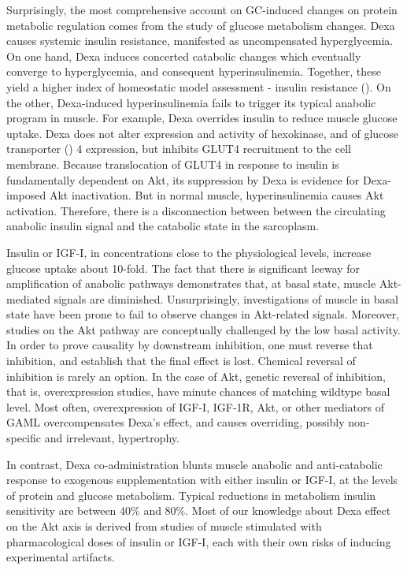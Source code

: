 \documentclass[12pt,english]{report}\usepackage[]{graphicx}\usepackage[]{color}
\begin{document}
Surprisingly, the most comprehensive account on GC-induced changes
on protein metabolic regulation comes from the study of glucose metabolism
changes. Dexa causes systemic insulin resistance, manifested as uncompensated
hyperglycemia\citep{nicastro2012effectsa}. On one hand, Dexa induces
concerted catabolic changes which eventually converge to hyperglycemia,
and consequent hyperinsulinemia. Together, these yield a higher index
of homeostatic model assessment - insulin resistance ()\citep{saad1993modulation}.
On the other, Dexa-induced hyperinsulinemia fails to trigger its typical
anabolic program in muscle. For example, Dexa overrides insulin to
reduce muscle glucose uptake\citep{weinstein1995glucocorticoid-induced}.
Dexa does not alter expression and activity of hexokinase, and of
glucose transporter () 4
expression\citep{dimitriadis1997effects}, but inhibits GLUT4 recruitment
to the cell membrane\citep{weinstein1995glucocorticoid-induced,dimitriadis1997effects}.
Because translocation of GLUT4 in response to insulin is fundamentally
dependent on Akt\citep{wang1999protein}, its suppression by Dexa
is evidence for Dexa-imposed Akt inactivation. But in normal muscle,
hyperinsulinemia causes Akt activation. Therefore, there is a disconnection
between between the circulating anabolic insulin signal and the catabolic
state in the sarcoplasm.

Insulin or IGF-I, in concentrations close to the physiological levels,
increase glucose uptake about 10-fold\citep{weinstein1995glucocorticoid-induced}.
The fact that there is significant leeway for amplification of anabolic
pathways demonstrates that, at basal state, muscle Akt-mediated signals
are diminished. Unsurprisingly, investigations of muscle in basal
state have been prone to fail to observe changes in Akt-related signals.
Moreover, studies on the Akt pathway are conceptually challenged by
the low basal activity. In order to prove causality by downstream
inhibition, one must reverse that inhibition, and establish that the
final effect is lost. Chemical reversal of inhibition is rarely an
option. In the case of Akt, genetic reversal of inhibition, that is,
overexpression studies, have minute chances of matching wildtype basal
level. Most often, overexpression of IGF-I, IGF-1R, Akt, or other
mediators of GAML overcompensates Dexa's effect, and causes overriding,
possibly non-specific and irrelevant, hypertrophy.

In contrast, Dexa co-administration blunts muscle anabolic and anti-catabolic
response to exogenous supplementation with either insulin or IGF-I,
at the levels of protein and glucose metabolism\citep{dardevet1999glucocorticoid-induced,dardevet1998glucocorticoid}.
Typical reductions in metabolism insulin sensitivity are between 40\%
and 80\%. Most of our knowledge about Dexa effect on the Akt axis
is derived from studies of muscle stimulated with pharmacological
doses of insulin or IGF-I, each with their own risks of inducing experimental
artifacts.
\end{document}
